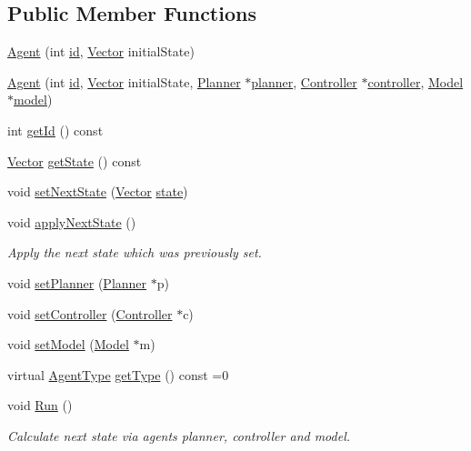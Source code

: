 \subsection*{Public Member Functions}
\begin{DoxyCompactItemize}
\item 
\hyperlink{classAgent_adaa4e2f9264e069d59ef234d26c8763e}{Agent} (int \hyperlink{classAgent_af8b58fe9dafe460ed2ddf87435a7feed}{id}, \hyperlink{Agent_8hpp_a5dd127bb3cb18b011cf5fd80a906e830}{Vector} initial\+State)
\item 
\hyperlink{classAgent_a7f32b3b61989f9dc8a3858bafff71da0}{Agent} (int \hyperlink{classAgent_af8b58fe9dafe460ed2ddf87435a7feed}{id}, \hyperlink{Agent_8hpp_a5dd127bb3cb18b011cf5fd80a906e830}{Vector} initial\+State, \hyperlink{classPlanner}{Planner} $\ast$\hyperlink{classAgent_aa71be9f465a3d8eed4e3297d8aa49eb1}{planner}, \hyperlink{classController}{Controller} $\ast$\hyperlink{classAgent_a35138f4fa7fa31760928b84680f7a886}{controller}, \hyperlink{classModel}{Model} $\ast$\hyperlink{classAgent_a41c7b65f7ad35cc6756cf0313edaa9a0}{model})
\item 
int \hyperlink{classAgent_aa5d95bd591e032b4763d9bbdf6ade810}{get\+Id} () const 
\item 
\hyperlink{Agent_8hpp_a5dd127bb3cb18b011cf5fd80a906e830}{Vector} \hyperlink{classAgent_a1661a5a75e7ab73c69269ed1270dc1e7}{get\+State} () const 
\item 
void \hyperlink{classAgent_aa204d1659d5057accf5ea283604eed2b}{set\+Next\+State} (\hyperlink{Agent_8hpp_a5dd127bb3cb18b011cf5fd80a906e830}{Vector} \hyperlink{classAgent_a6ef1b669e841f34e42619a2429160dc7}{state})
\item 
void \hyperlink{classAgent_a2e23f08188162e06a4072892d6919f9d}{apply\+Next\+State} ()
\begin{DoxyCompactList}\small\item\em Apply the next state which was previously set. \end{DoxyCompactList}\item 
void \hyperlink{classAgent_a917ab100e5e7ce4446269375869215b1}{set\+Planner} (\hyperlink{classPlanner}{Planner} $\ast$p)
\item 
void \hyperlink{classAgent_a5621b9471f9ed9bd8750709ff4fab46b}{set\+Controller} (\hyperlink{classController}{Controller} $\ast$c)
\item 
void \hyperlink{classAgent_a5a53cde60df6c2e733e809bdd1e96a56}{set\+Model} (\hyperlink{classModel}{Model} $\ast$m)
\item 
virtual \hyperlink{Agent_8hpp_ad2c3439c0fbb853c45129639d2581c51}{Agent\+Type} \hyperlink{classAgent_a48eedea220997f4aa85ce4596f2c49c5}{get\+Type} () const =0
\item 
void \hyperlink{classAgent_a80e144d0fd78f8e1a54abf92158448e1}{Run} ()
\begin{DoxyCompactList}\small\item\em Calculate next state via agent\textquotesingle{}s planner, controller and model. \end{DoxyCompactList}\end{DoxyCompactItemize}
